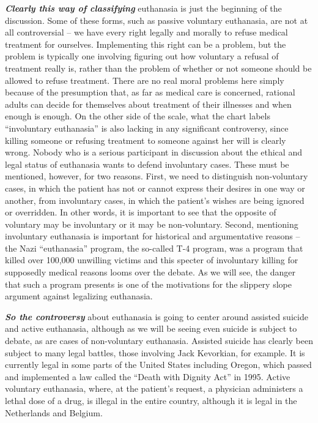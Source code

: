 \documentclass[
  12pt, openany]{book}
\theoremstyle{definition}
\theoremstyle{definition}
\theoremstyle{definition}
\theoremstyle{definition}
\theoremstyle{remark}
\begin{document}
\textbf{\emph{Clearly this way of classifying}} euthanasia is just the beginning of the discussion. Some of these forms, such as passive voluntary euthanasia, are not at all controversial -- we have every right legally and morally to refuse medical treatment for ourselves. Implementing this right can be a problem, but the problem is typically one involving figuring out how voluntary a refusal of treatment really is, rather than the problem of whether or not someone should be allowed to refuse treatment. There are no real moral problems here simply because of the presumption that, as far as medical care is concerned, rational adults can decide for themselves about treatment of their illnesses and when enough is enough. On the other side of the scale, what the chart labels ``involuntary euthanasia'' is also lacking in any significant controversy, since killing someone or refusing treatment to someone against her will is clearly wrong. Nobody who is a serious participant in discussion about the ethical and legal status of euthanasia wants to defend involuntary cases. These must be mentioned, however, for two reasons. First, we need to distinguish non-voluntary cases, in which the patient has not or cannot express their desires in one way or another, from involuntary cases, in which the patient's wishes are being ignored or overridden. In other words, it is important to see that the opposite of voluntary may be involuntary or it may be non-voluntary. Second, mentioning involuntary euthanasia is important for historical and argumentative reasons -- the Nazi ``euthanasia'' program, the so-called T-4 program, was a program that killed over 100,000 unwilling victims and this specter of involuntary killing for supposedly medical reasons looms over the debate. As we will see, the danger that such a program presents is one of the motivations for the slippery slope argument against legalizing euthanasia.

\textbf{\emph{So the controversy}} about euthanasia is going to center around assisted suicide and active euthanasia, although as we will be seeing even suicide is subject to debate, as are cases of non-voluntary euthanasia. Assisted suicide has clearly been subject to many legal battles, those involving Jack Kevorkian, for example. It is currently legal in some parts of the United States including Oregon, which passed and implemented a law called the ``Death with Dignity Act'' in 1995. Active voluntary euthanasia, where, at the patient's request, a physician administers a lethal dose of a drug, is illegal in the entire country, although it is legal in the Netherlands and Belgium.
\end{document}
